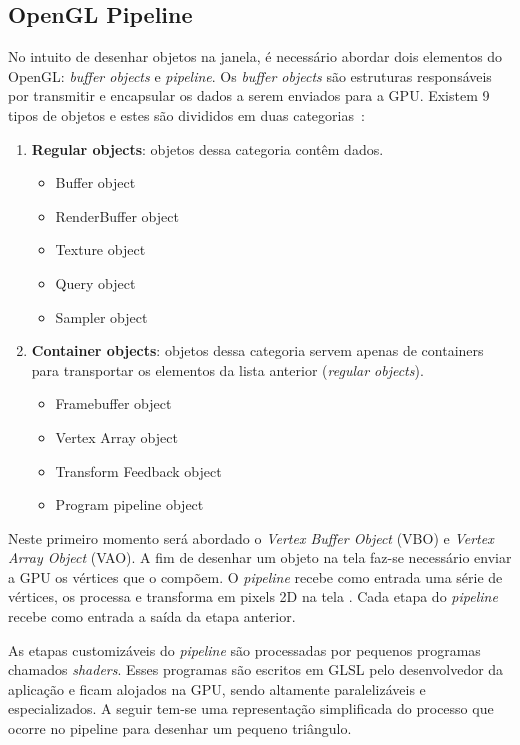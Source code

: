 \documentclass[12pt, 
openright, 
oneside, 
a4paper,    
brazil]{facom-ufu-abntex2}
\begin{document}
\subsection{OpenGL Pipeline}
No intuito de desenhar objetos na janela, é necessário abordar dois elementos do OpenGL: \textit{buffer objects} e \textit{pipeline}. Os \textit{buffer objects} são estruturas responsáveis por transmitir e encapsular os dados a serem enviados para a GPU. Existem 9 tipos de objetos e estes são divididos em duas categorias~\cite{OpenGLObject}:

\begin{enumerate}
\item \textbf{Regular objects}: objetos dessa categoria contêm dados.
\begin{itemize}
\item Buffer object
\item RenderBuffer object
\item Texture object
\item Query object
\item Sampler object
\end{itemize}
\item \textbf{Container objects}:  objetos dessa categoria servem apenas de containers para transportar os elementos da lista anterior (\textit{regular objects}). 
\begin{itemize}
\item Framebuffer object
\item Vertex Array object
\item Transform Feedback object
\item Program pipeline object
\end{itemize}
\end{enumerate}

Neste primeiro momento será abordado o \textit{Vertex Buffer Object} (VBO) e \textit{Vertex Array Object} (VAO). A fim de desenhar um objeto na tela faz-se necessário enviar a GPU os vértices que o compõem. O \textit{pipeline} recebe como entrada uma série de vértices, os processa e transforma em pixels 2D na tela \cite{LearnOpenGL}. Cada etapa do \textit{pipeline} recebe como entrada a saída da etapa anterior.

As etapas customizáveis do \textit{pipeline} são processadas por pequenos programas chamados \textit{shaders}. Esses programas são escritos em GLSL pelo desenvolvedor da aplicação e ficam alojados na GPU, sendo altamente paralelizáveis e especializados. A seguir tem-se uma representação simplificada do processo que ocorre no pipeline para desenhar um pequeno triângulo.
\end{document}
